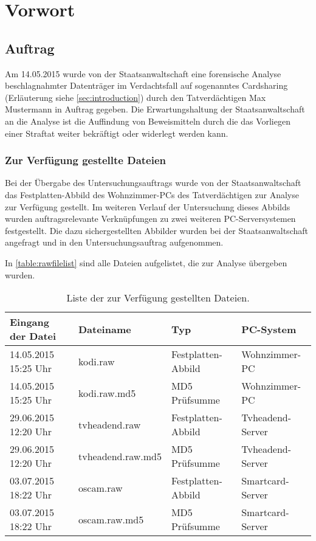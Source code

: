 \chapter{Vorwort}
\label{chap:prologue}

\section{Auftrag}
\label{sec:contract}
Am 14.05.2015 wurde von der Staatsanwaltschaft eine forensische Analyse beschlagnahmter Datenträger im Verdachtsfall auf sogenanntes Cardsharing (Erläuterung siehe \autoref{sec:introduction}) durch den Tatverdächtigen Max Mustermann in Auftrag gegeben. Die Erwartungshaltung der Staatsanwaltschaft an die Analyse ist die Auffindung von Beweismitteln durch die das Vorliegen einer Straftat weiter bekräftigt oder widerlegt werden kann.

\subsection{Zur Verfügung gestellte Dateien}
\label{sec:contract-files}

Bei der Übergabe des Untersuchungsauftrags wurde von der Staatsanwaltschaft das Festplatten-Abbild des Wohnzimmer-PCs des Tatverdächtigen zur Analyse zur Verfügung gestellt. Im weiteren Verlauf der Untersuchung dieses Abbilds wurden auftragsrelevante Verknüpfungen zu zwei weiteren PC-Serversystemen festgestellt. Die dazu sichergestellten Abbilder wurden bei der Staatsanwaltschaft angefragt und in den Untersuchungsauftrag aufgenommen.

In \autoref{table:rawfilelist} sind alle Dateien aufgelistet, die zur Analyse übergeben wurden.

\begin{table}[h]
\begin{tabular}{llll}
\toprule
Eingang der Datei & Dateiname & Typ & PC-System \\ 
\midrule
14.05.2015 15:25 Uhr & kodi.raw & Festplatten-Abbild & Wohnzimmer-PC \\ 
14.05.2015 15:25 Uhr & kodi.raw.md5 & MD5 Prüfsumme & Wohnzimmer-PC \\ 
29.06.2015 12:20 Uhr & tvheadend.raw & Festplatten-Abbild & Tvheadend-Server \\ 
29.06.2015 12:20 Uhr & tvheadend.raw.md5 & MD5 Prüfsumme & Tvheadend-Server \\ 
03.07.2015 18:22 Uhr & oscam.raw & Festplatten-Abbild & Smartcard-Server \\ 
03.07.2015 18:22 Uhr & oscam.raw.md5 & MD5 Prüfsumme & Smartcard-Server \\ 
\bottomrule
\end{tabular} 
\caption{Liste der zur Verfügung gestellten Dateien.}
\label{table:rawfilelist}
\end{table}

